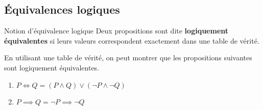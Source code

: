 \documentclass[16pt]{report}
\begin{document}
\begin{multicols*}{2}

            
            \section{Équivalences logiques}
            \begin{Definitionx}{Notion d'équivalence logique}{}
                    Deux propositions sont dite \textbf{logiquement équivalentes} si leurs valeurs correspondent 
                    exactement dans une table de vérité.
            \end{Definitionx}


                    En utilisant une table de vérité, on peut montrer que les propositions suivantes sont 
                    logiquement équivalentes. 
                    \begin{enumerate}
                        \item $ P \Leftrightarrow  Q = (P \land Q) \lor (\neg P \land \neg Q )$ 
                        \item $ P \implies Q = \neg P \implies \neg Q$  
                    \end{enumerate}




\end{multicols*}
\end{document}
